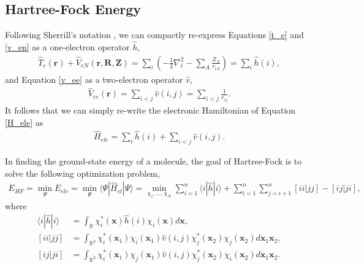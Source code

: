 \documentclass[12pt]{article}
\newcommand{\vect}[1]{\boldsymbol{#1}}
\newcommand{\Hel}{\hat{H}_{el}}
\newcommand{\R}{\mathbb{R}}
\begin{document}
\subsection{Hartree-Fock Energy}
Following Sherrill's notation \cite{sherrill2001}, we can compactly re-express Equations \ref{t_e} and \ref{v_en} as a one-electron operator $\hat{h}$,
\begin{align}
\hat{T}_e(\vect{r}) + \hat{V}_{eN}(\vect{r}, \vect{R}, \vect{Z})  = \sum_{i} \left(-\frac{1}{2} \nabla_i^2 - \sum_A \frac{Z_A}{r_{iA}}\right) = \sum_{i} \hat{h}(i) ,
\end{align}
and Equation \ref{v_ee} as a two-electron operator $\hat{v}$,
\begin{align}
\hat{V}_{ee}(\vect{r}) = \sum_{i < j} \hat{v}(i, j) = \sum_{i < j} \frac{1}{r_{ij}}.
\end{align}
It follows that we can simply re-write the electronic Hamiltonian of Equation \ref{H_ele} as 
\begin{align}
\hat{H}_{ele}  = \sum_i \hat{h}(i) + \sum_{i < j}\hat{v}(i, j).
\end{align}

In finding the ground-state energy of a molecule, the goal of Hartree-Fock is to solve the following optimization problem, 
\begin{align}
E_{HF} = \min_{\Psi} E_{ele} = \min_{\Psi} \langle \Psi | \Hel | \Psi \rangle = \min_{\chi_1, \ldots, \chi_N} \sum_{i=1}^n \langle i | \hat{h} | i \rangle + \sum_{i=1}^n \sum_{j=i+1}^n [ i i | jj] - [ij | ji], 
\end{align}
where
\begin{align}
\langle i | \hat{h} | i \rangle &= \int_\R \chi_i^*(\vect x) \hat{h}(i) \chi_i (\vect x) d \vect x, \\
[ii | jj] &= \int_{\R^2} \chi_i^*(\vect x_1) \chi_i(\vect x_1) \hat{v}(i, j) \chi_j^*(\vect x_2) \chi_j(\vect x_2) d\vect x_1 \vect x_2, \\
[ij | ji] &= \int_{\R^2} \chi_i^*(\vect x_1) \chi_j(\vect x_1) \hat{v}(i, j) \chi_j^*(\vect x_2) \chi_i(\vect x_2) d\vect x_1 \vect x_2.
\end{align}
\end{document}
